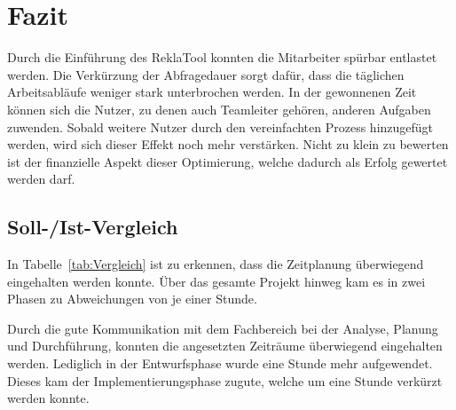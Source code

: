 \section{Fazit} 
\label{sec:Fazit}
Durch die Einführung des ReklaTool konnten die Mitarbeiter spürbar entlastet werden.
Die Verkürzung der Abfragedauer sorgt dafür, dass die täglichen Arbeitsabläufe weniger
stark unterbrochen werden. In der gewonnenen Zeit können sich die Nutzer, zu denen auch
Teamleiter gehören, anderen Aufgaben zuwenden. Sobald weitere Nutzer durch den vereinfachten
Prozess hinzugefügt werden, wird sich dieser Effekt noch mehr verstärken. Nicht zu klein zu bewerten
ist der finanzielle Aspekt dieser Optimierung, welche dadurch als Erfolg gewertet werden darf. 

\subsection{Soll-/Ist-Vergleich}
\label{sec:SollIstVergleich}
In Tabelle~\ref{tab:Vergleich} ist zu erkennen, dass die Zeitplanung überwiegend eingehalten werden konnte.
Über das gesamte Projekt hinweg kam es in zwei Phasen zu Abweichungen von je einer Stunde.\\

Durch die gute Kommunikation mit dem Fachbereich bei der Analyse, Planung und Durchführung, konnten die angesetzten Zeiträume  
überwiegend eingehalten werden. Lediglich in der Entwurfsphase wurde eine Stunde mehr aufgewendet. Dieses kam der Implementierungsphase
zugute, welche um eine Stunde verkürzt werden konnte. 


